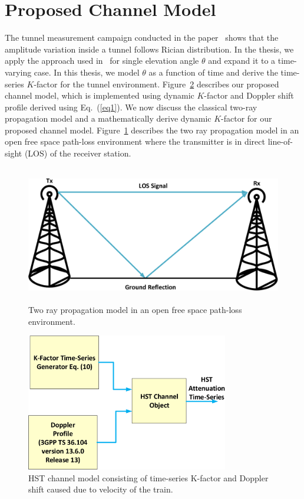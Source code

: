 \section{Proposed Channel Model}
The tunnel measurement campaign conducted in the paper~\cite{inplter8} shows that the amplitude variation inside a tunnel follows Rician distribution. In the thesis, we apply the approach used in~\cite{inlter15} for single elevation angle $\theta$ and expand it to a time-varying case. In this thesis, we model $\theta$ as a function of time and derive the time-series $K$-factor for the tunnel environment. Figure~\ref{subblock} describes our proposed channel model, which is implemented using dynamic $K$-factor and Doppler shift profile derived using Eq.~(\ref{eq1}). We now discuss the classical two-ray propagation model and a mathematically derive dynamic $K$-factor for our proposed channel model. Figure~\ref{tworay} describes the two ray propagation model in an open free space path-loss environment where the transmitter is in direct line-of-sight (LOS) of the receiver station.

\begin{figure}[!ht]
\centering
\includegraphics[width=\textwidth,height=6cm,keepaspectratio]{images/Gill/lte_figs/tworay.eps} 
\caption{Two ray propagation model in an open free space path-loss environment.}
\label{tworay}
\end{figure}

\begin{figure}[!ht]
\centering
\includegraphics[width=\textwidth,height=6cm,keepaspectratio]{images/Gill/lte_figs/subblock.eps} 
\caption{HST channel model consisting of time-series K-factor and Doppler shift caused due to velocity of the train.}
\label{subblock}
\end{figure}

